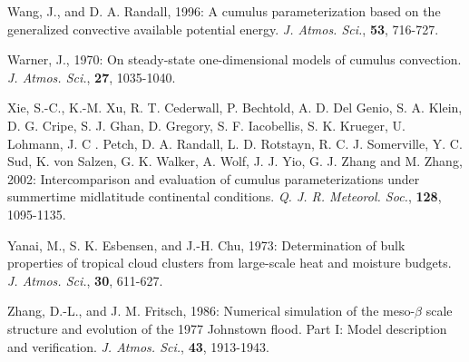 \por
Wang, J., and D. A. Randall, 1996: A cumulus parameterization based on
the generalized convective available potential energy.
{\it J. Atmos. Sci.}, {\bf 53}, 716-727.

\por
Warner, J., 1970: On steady-state one-dimensional models of
cumulus convection. {\it J. Atmos. Sci.}, {\bf 27}, 1035-1040.


\por
Xie, S.-C., K.-M. Xu, R. T. Cederwall, P. Bechtold, A. D. Del Genio, S. A. Klein,
D. G. Cripe, S. J. Ghan, D. Gregory, S. F. Iacobellis, S. K. Krueger, U. Lohmann,
J. C . Petch, D. A. Randall, L. D. Rotstayn, R. C. J. Somerville, Y. C. Sud, 
K. von Salzen, G. K. Walker, A. Wolf, J. J. Yio, G. J. Zhang and M. Zhang, 2002:
Intercomparison and evaluation of cumulus parameterizations under summertime midlatitude
continental conditions. {\it Q. J. R. Meteorol. Soc.}, {\bf 128}, 1095-1135.

\por
Yanai, M., S. K. Esbensen, and J.-H. Chu, 1973: Determination of
bulk properties of tropical cloud clusters from large-scale heat and moisture
budgets. {\it J. Atmos. Sci.}, {\bf 30}, 611-627.

\por
Zhang, D.-L., and J. M. Fritsch, 1986: Numerical simulation of the
meso-$\beta$ scale structure and evolution of the 1977 Johnstown flood.
Part I: Model description and verification. {\it J. Atmos. Sci.},
{\bf 43}, 1913-1943.

%




%
